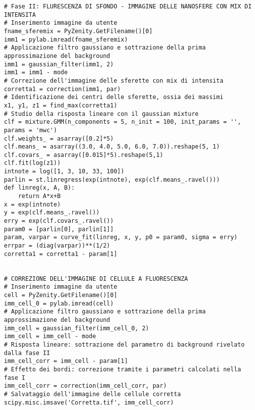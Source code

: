 \begin{lstlisting}
# Fase II: FLURESCENZA DI SFONDO - IMMAGINE DELLE NANOSFERE CON MIX DI INTENSITA
# Inserimento immagine da utente
fname_sferemix = PyZenity.GetFilename()[0]
imm1 = pylab.imread(fname_sferemix)
# Applicazione filtro gaussiano e sottrazione della prima approssimazione del background
imm1 = gaussian_filter(imm1, 2)
imm1 = imm1 - mode
# Correzione dell'immagine delle sferette con mix di intensita
corretta1 = correction(imm1, par)
# Identificazione dei centri delle sferette, ossia dei massimi
x1, y1, z1 = find_max(corretta1)
# Studio della risposta lineare con il gaussian mixture
clf = mixture.GMM(n_components = 5, n_init = 100, init_params = '', params = 'mwc') 
clf.weights_ = asarray([0.2]*5)
clf.means_ = asarray((3.0, 4.0, 5.0, 6.0, 7.0)).reshape(5, 1)
clf.covars_ = asarray([0.015]*5).reshape(5,1)
clf.fit(log(z1))
intnote = log([1, 3, 10, 33, 100])
parlin = st.linregress(exp(intnote), exp(clf.means_.ravel()))
def linreg(x, A, B):
    return A*x+B
x = exp(intnote)
y = exp(clf.means_.ravel())
erry = exp(clf.covars_.ravel())
param0 = [parlin[0], parlin[1]]
param, varpar = curve_fit(linreg, x, y, p0 = param0, sigma = erry)
errpar = (diag(varpar))**(1/2)
corretta1 = corretta1 - param[1]


# CORREZIONE DELL'IMMAGINE DI CELLULE A FLUORESCENZA
# Inserimento immagine da utente
cell = PyZenity.GetFilename()[0]
imm_cell_0 = pylab.imread(cell)
# Applicazione filtro gaussiano e sottrazione della prima approssimazione del background
imm_cell = gaussian_filter(imm_cell_0, 2)
imm_cell = imm_cell - mode
# Risposta lineare: sottrazione del parametro di background rivelato dalla fase II
imm_cell_corr = imm_cell - param[1]
# Effetto dei bordi: correzione tramite i parametri calcolati nella fase I
imm_cell_corr = correction(imm_cell_corr, par)
# Salvataggio dell'immagine delle cellule corretta
scipy.misc.imsave('Corretta.tif', imm_cell_corr)
\end{lstlisting}